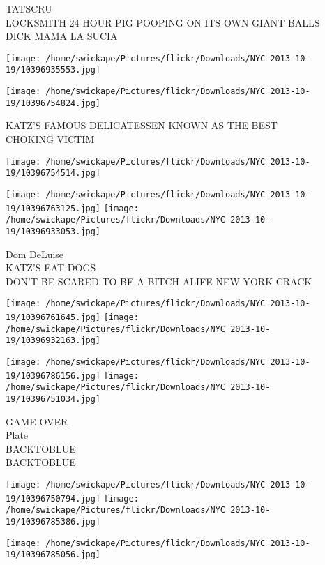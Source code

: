 \documentclass[10pt,letterpaper]{article}
\begin{document}
TATSCRU\\
LOCKSMITH 24 HOUR PIG POOPING ON ITS OWN GIANT BALLS\\
DICK MAMA LA SUCIA\\
\pagebreak

\texttt{[image: /home/swickape/Pictures/flickr/Downloads/NYC 2013-10-19/10396935553.jpg]}

\vspace{0.25in}
\texttt{[image: /home/swickape/Pictures/flickr/Downloads/NYC 2013-10-19/10396754824.jpg]}

KATZ'S FAMOUS DELICATESSEN KNOWN AS THE BEST\\
CHOKING VICTIM\\
\pagebreak

\texttt{[image: /home/swickape/Pictures/flickr/Downloads/NYC 2013-10-19/10396754514.jpg]}

\vspace{0.25in}
\texttt{[image: /home/swickape/Pictures/flickr/Downloads/NYC 2013-10-19/10396763125.jpg]}
\texttt{[image: /home/swickape/Pictures/flickr/Downloads/NYC 2013-10-19/10396933053.jpg]}

Dom DeLuise\\
KATZ'S EAT DOGS\\
DON'T BE SCARED TO BE A BITCH ALIFE NEW YORK CRACK\\
\pagebreak

\texttt{[image: /home/swickape/Pictures/flickr/Downloads/NYC 2013-10-19/10396761645.jpg]}
\texttt{[image: /home/swickape/Pictures/flickr/Downloads/NYC 2013-10-19/10396932163.jpg]}

\texttt{[image: /home/swickape/Pictures/flickr/Downloads/NYC 2013-10-19/10396786156.jpg]}
\texttt{[image: /home/swickape/Pictures/flickr/Downloads/NYC 2013-10-19/10396751034.jpg]}

GAME OVER\\
Plate\\
BACKTOBLUE\\
BACKTOBLUE\\
\pagebreak

\texttt{[image: /home/swickape/Pictures/flickr/Downloads/NYC 2013-10-19/10396750794.jpg]}
\texttt{[image: /home/swickape/Pictures/flickr/Downloads/NYC 2013-10-19/10396785386.jpg]}

\vspace{0.25in}
\texttt{[image: /home/swickape/Pictures/flickr/Downloads/NYC 2013-10-19/10396785056.jpg]}
\end{document}
